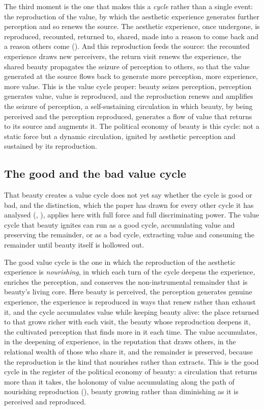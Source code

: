 The third moment is the one that makes this a \emph{cycle} rather than a single event: the reproduction of the value, by which the aesthetic experience generates further perception and so renews the source. The aesthetic experience, once undergone, is reproduced, recounted, returned to, shared, made into a reason to come back and a reason others come (). And this reproduction feeds the source: the recounted experience draws new perceivers, the return visit renews the experience, the shared beauty propagates the seizure of perception to others, so that the value generated at the source flows back to generate more perception, more experience, more value. This is the value cycle proper: beauty seizes perception, perception generates value, value is reproduced, and the reproduction renews and amplifies the seizure of perception, a self-sustaining circulation in which beauty, by being perceived and the perception reproduced, generates a flow of value that returns to its source and augments it. The political economy of beauty is this cycle: not a static force but a dynamic circulation, ignited by aesthetic perception and sustained by its reproduction.

\subsection{The good and the bad value cycle}
\label{p21:sub:pe-goodbadcycle}

That beauty creates a value cycle does not yet say whether the cycle is good or bad, and the distinction, which the paper has drawn for every other cycle it has analysed (, ), applies here with full force and full discriminating power. The value cycle that beauty ignites can run as a good cycle, accumulating value and preserving the remainder, or as a bad cycle, extracting value and consuming the remainder until beauty itself is hollowed out.

The good value cycle is the one in which the reproduction of the aesthetic experience is \emph{nourishing}, in which each turn of the cycle deepens the experience, enriches the perception, and conserves the non-instrumental remainder that is beauty's living core. Here beauty is perceived, the perception generates genuine experience, the experience is reproduced in ways that renew rather than exhaust it, and the cycle accumulates value while keeping beauty alive: the place returned to that grows richer with each visit, the beauty whose reproduction deepens it, the cultivated perception that finds more in it each time. The value accumulates, in the deepening of experience, in the reputation that draws others, in the relational wealth of those who share it, and the remainder is preserved, because the reproduction is the kind that nourishes rather than extracts. This is the good cycle in the register of the political economy of beauty: a circulation that returns more than it takes, the holonomy of value accumulating along the path of nourishing reproduction (), beauty growing rather than diminishing as it is perceived and reproduced.

